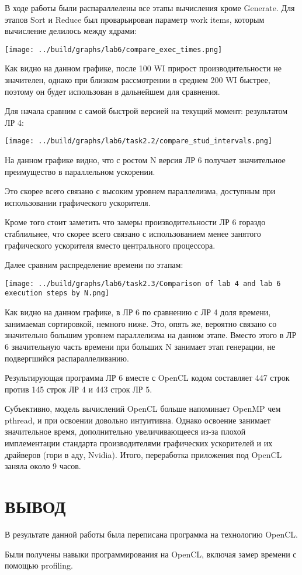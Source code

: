 \documentclass[14pt, a4paper, oneside, final]{extarticle}
\begin{document}
В ходе работы были распараллелены все этапы вычисления кроме Generate. Для этапов Sort и Reduce был проварьирован параметр work items, которым вычисление делилось между ядрами:

\texttt{[image: ../build/graphs/lab6/compare\_exec\_times.png]}

Как видно на данном графике, после 100 WI прирост производительности не значителен, однако при близком рассмотрении в среднем 200 WI быстрее, поэтому он будет использован в дальнейшем для сравнения.

Для начала сравним с самой быстрой версией на текущий момент: результатом ЛР 4:

\texttt{[image: ../build/graphs/lab6/task2.2/compare\_stud\_intervals.png]}

На данном графике видно, что с ростом N версия ЛР 6 получает значительное преимущество в параллельном ускорении.

Это скорее всего связано с высоким уровнем параллелизма, доступным при использовании графического ускорителя.

Кроме того стоит заметить что замеры производительности ЛР 6 гораздо стаблильнее, что скорее всего связано с использованием менее занятого графического ускорителя вместо центрального процессора.

Далее сравним распределение времени по этапам:

\texttt{[image: ../build/graphs/lab6/task2.3/Comparison of lab 4 and lab 6 execution steps by N.png]}

Как видно на данном графике, в ЛР 6 по сравнению с ЛР 4 доля времени, занимаемая сортировкой, немного ниже. Это, опять же, вероятно связано со значительно большим уровнем параллелизма на данном этапе. Вместо этого в ЛР 6 значительную часть времени при больших N занимает этап генерации, не подвергшийся распараллеливанию.

Результирующая программа ЛР 6 вместе с OpenCL кодом составляет 447 строк против 145 строк ЛР 4 и 443 строк ЛР 5.

Субъективно, модель вычислений OpenCL больше напоминает OpenMP чем pthread, и при освоении довольно интуитивна. Однако освоение занимает значительное время, дополнительно увеличивающееся из-за плохой имплементации стандарта производителями графических ускорителей и их драйверов (гори в аду, Nvidia). Итого, переработка приложения под OpenCL заняла около 9 часов.

\clearpage
\section*{ВЫВОД}

В результате данной работы была переписана программа на технологию OpenCL.

Были получены навыки программирования на OpenCL, включая замер времени с помощью profiling.
\end{document}
